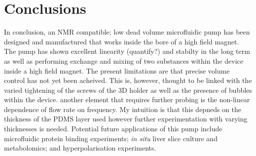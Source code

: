 \section{Conclusions}

In conclusion, an NMR compatible; low dead volume microfluidic pump has been designed and
manufactured that works inside the bore of a high field magnet. The pump has shown
excellent linearity (quantify?) and stabilty in the long term as well as performing exchange and
mixing of two substances within the device inside a high field magnet. The present limitations
are that precise volume control has not yet been acheived. This is, however, thought to be linked
with the varied tightening of the screws of the 3D holder as well as the presence of bubbles
within the device. another element that requires further probing is the non-linear dependence of
flow rate on frequency. My intuition is that this depneds on the thickness of the PDMS layer used
however further experimentation with varying thicknesses is needed. Potential future applications
of this pump include microfluidic protein binding experiments; \textit{in situ} liver slice
culture and metabolomics; and hyperpolarisation experiments.
